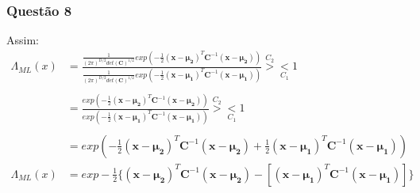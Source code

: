 \documentclass{beamer}\usepackage[]{graphicx}\usepackage[]{color}
\begin{document}
		\begin{frame}
			\frametitle{Questão 8}
			Assim:
			\begin{align*}
				\Lambda_{ML}(x) &= \frac{\frac{1}{(2\pi)^{D/2}det(\boldsymbol{C})^{1/2}}exp(-\frac{1}{2}(\boldsymbol{x} - \boldsymbol{\mu_{2}})^{T}\boldsymbol{C}^{-1}(\boldsymbol{x} - \boldsymbol{\mu_{2}}))}{\frac{1}{(2\pi)^{D/2}det(\boldsymbol{C})^{1/2}}exp(-\frac{1}{2}(\boldsymbol{x} - \boldsymbol{\mu_{1}})^{T}\boldsymbol{C}^{-1}(\boldsymbol{x} - \boldsymbol{\mu_{1}}))}\overset{C_{2}}{>} \underset{C_{1}}{<} 1\\
				\\
				&= \frac{exp(-\frac{1}{2}(\boldsymbol{x} - \boldsymbol{\mu_{2}})^{T}\boldsymbol{C}^{-1}(\boldsymbol{x} - \boldsymbol{\mu_{2}}))}{exp(-\frac{1}{2}(\boldsymbol{x} - \boldsymbol{\mu_{1}})^{T}\boldsymbol{C}^{-1}(\boldsymbol{x} - \boldsymbol{\mu_{1}}))}\overset{C_{2}}{>} \underset{C_{1}}{<} 1\\
				\\
				&=exp(-\frac{1}{2}(\boldsymbol{x} - \boldsymbol{\mu_{2}})^{T}\boldsymbol{C}^{-1}(\boldsymbol{x} - \boldsymbol{\mu_{2}}) + \frac{1}{2}(\boldsymbol{x} - \boldsymbol{\mu_{1}})^{T}\boldsymbol{C}^{-1}(\boldsymbol{x} - \boldsymbol{\mu_{1}}))\\
				\Lambda_{ML}(x) &= exp-\frac{1}{2}\{(\boldsymbol{x} - \boldsymbol{\mu_{2}})^{T}\boldsymbol{C}^{-1}(\boldsymbol{x} - \boldsymbol{\mu_{2}}) - [(\boldsymbol{x} - \boldsymbol{\mu_{1}})^{T}\boldsymbol{C}^{-1}(\boldsymbol{x} - \boldsymbol{\mu_{1}})]\}
			\end{align*}
		\end{frame}
		
\end{document}
